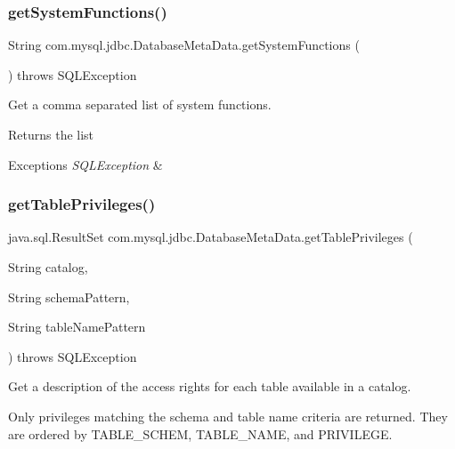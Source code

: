 \subsubsection{\texorpdfstring{get\+System\+Functions()}{getSystemFunctions()}}
{\footnotesize\ttfamily String com.\+mysql.\+jdbc.\+Database\+Meta\+Data.\+get\+System\+Functions (\begin{DoxyParamCaption}{ }\end{DoxyParamCaption}) throws S\+Q\+L\+Exception}

Get a comma separated list of system functions.

\begin{DoxyReturn}{Returns}
the list 
\end{DoxyReturn}

\begin{DoxyExceptions}{Exceptions}
{\em S\+Q\+L\+Exception} & \\
\hline
\end{DoxyExceptions}
\mbox{\label{classcom_1_1mysql_1_1jdbc_1_1_database_meta_data_a3c5930c79653f91ef2ce808d3cd37b45}} 
\subsubsection{\texorpdfstring{get\+Table\+Privileges()}{getTablePrivileges()}}
{\footnotesize\ttfamily java.\+sql.\+Result\+Set com.\+mysql.\+jdbc.\+Database\+Meta\+Data.\+get\+Table\+Privileges (\begin{DoxyParamCaption}\item[{String}]{catalog,  }\item[{String}]{schema\+Pattern,  }\item[{String}]{table\+Name\+Pattern }\end{DoxyParamCaption}) throws S\+Q\+L\+Exception}

Get a description of the access rights for each table available in a catalog. 

Only privileges matching the schema and table name criteria are returned. They are ordered by T\+A\+B\+L\+E\+\_\+\+S\+C\+H\+EM, T\+A\+B\+L\+E\+\_\+\+N\+A\+ME, and P\+R\+I\+V\+I\+L\+E\+GE. 

